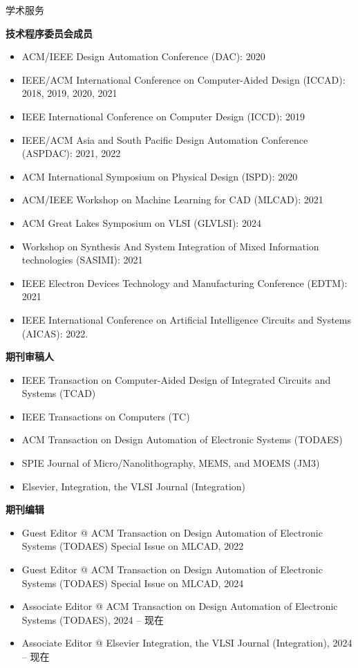 
\begin{rSection}{学术服务}

\textbf{技术程序委员会成员}
\begin{itemize}
    \item ACM/IEEE Design Automation Conference (DAC): 2020
    \item IEEE/ACM International Conference on Computer-Aided Design (ICCAD): 2018, 2019, 2020, 2021
    \item IEEE International Conference on Computer Design (ICCD): 2019
    \item IEEE/ACM Asia and South Pacific Design Automation Conference (ASPDAC): 2021, 2022
    \item ACM International Symposium on Physical Design (ISPD): 2020
    \item ACM/IEEE Workshop on Machine Learning for CAD (MLCAD): 2021
    \item ACM Great Lakes Symposium on VLSI (GLVLSI): 2024
    \item Workshop on Synthesis And System Integration of Mixed Information technologies (SASIMI): 2021
    \item IEEE Electron Devices Technology and Manufacturing Conference (EDTM): 2021
    \item IEEE International Conference on Artificial Intelligence Circuits and Systems (AICAS): 2022. 
\end{itemize}

\textbf{期刊审稿人}
\begin{itemize}
    \item IEEE Transaction on Computer-Aided Design of Integrated Circuits and Systems (TCAD)
    \item IEEE Transactions on Computers (TC)
    \item ACM Transaction on Design Automation of Electronic Systems (TODAES)
    \item SPIE Journal of Micro/Nanolithography, MEMS, and MOEMS (JM3)
    \item Elsevier, Integration, the VLSI Journal (Integration)
\end{itemize}

\textbf{期刊编辑}
\begin{itemize}
    \item Guest Editor @ ACM Transaction on Design Automation of Electronic Systems (TODAES) Special Issue on MLCAD, 2022
    \item Guest Editor @ ACM Transaction on Design Automation of Electronic Systems (TODAES) Special Issue on MLCAD, 2024
    \item Associate Editor @ ACM Transaction on Design Automation of Electronic Systems (TODAES), 2024 -- 现在
    \item Associate Editor @ Elsevier Integration, the VLSI Journal (Integration), 2024 -- 现在
\end{itemize}


\end{rSection}
